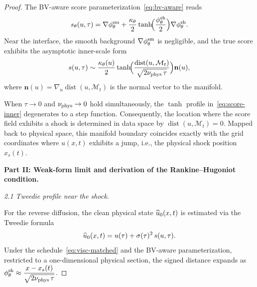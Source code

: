 \begin{proof}
The BV-aware score parameterization~\eqref{eq:bv-aware} reads
\begin{equation}
s_{\theta}(u,\tau)
  = \nabla\phi^{\mathrm{sm}}_{\theta} + \frac{\kappa_{\theta}}{2}\tanh\!\Bigl(\frac{\phi^{\mathrm{sh}}_{\theta}}{2}\Bigr)\nabla\phi^{\mathrm{sh}}_{\theta}.
\end{equation}
Near the interface, the smooth background $\nabla\phi^{\mathrm{sm}}_{\theta}$ is negligible, and the true
score exhibits the asymptotic inner-scale form
\begin{equation}
\label{eq:score-inner}
s(u,\tau)
  \sim \frac{\kappa_{\theta}(u)}{2}
       \tanh\!\Bigl( \frac{\operatorname{dist}(u,\mathcal{M}_{t})}
                          {\sqrt{2\nu_{\mathrm{phys}}\,\tau}} \Bigr)
       \mathbf{n}(u),
\end{equation}
where $\mathbf{n}(u) = \nabla_u \operatorname{dist}(u,\mathcal{M}_{t})$ is the normal vector
to the manifold.

\begin{lemma}
\label{lem:geom-corresp}
When $\tau\to0$ and $\nu_{\mathrm{phys}}\to0$ hold simultaneously, the $\tanh$ profile
in~\eqref{eq:score-inner} degenerates to a step function.
Consequently, the location where the score field exhibits a shock is determined in data space
by $\operatorname{dist}(u,\mathcal{M}_{t}) = 0$.
Mapped back to physical space, this manifold boundary coincides exactly with the grid
coordinates where $u(x,t)$ exhibits a jump, i.e., the physical shock position~$x_{s}(t)$.
\end{lemma}

\medskip
\noindent\textbf{Part II: Weak-form limit and derivation of the Rankine--Hugoniot condition.}

\smallskip
\noindent\textit{2.1  Tweedie profile near the shock.}

For the reverse diffusion, the clean physical state $\widehat{u}_{0}(x,t)$ is estimated via the
Tweedie formula
\begin{equation}
\widehat{u}_{0}(x,t) = u(\tau) + \sigma(\tau)^{2}\,s(u,\tau).
\end{equation}
Under the schedule~\eqref{eq:visc-matched} and the BV-aware parameterization, restricted
to a one-dimensional physical section, the signed distance expands as
$\displaystyle \phi^{\mathrm{sh}}_{\theta} \approx \frac{x - x_{s}(t)}{\sqrt{2\nu_{\mathrm{phys}}\,\tau}}$.


\end{proof}

